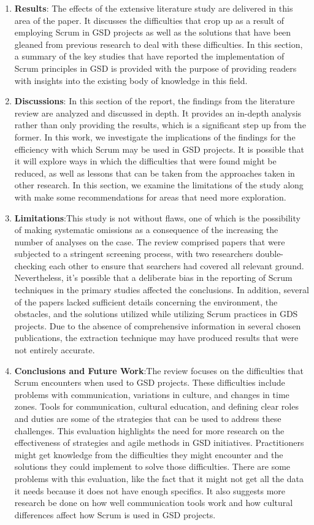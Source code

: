 \documentclass[conference]{IEEEtran}
\begin{document}
\begin{enumerate}
\item \textbf{Results}: The effects of the extensive literature study are delivered in this area of the paper. It discusses the difficulties that crop up as a result of employing Scrum in GSD projects as well as the solutions that have been gleaned from previous research to deal with these difficulties. In this section, a summary of the key studies that have reported the implementation of Scrum principles in GSD is provided with the purpose of providing readers with insights into the existing body of knowledge in this field.

\item \textbf{Discussions}: In this section of the report, the findings from the literature review are analyzed and discussed in depth. It provides an in-depth analysis rather than only providing the results, which is a significant step up from the former. In this work, we investigate the implications of the findings for the efficiency with which Scrum may be used in GSD projects. It is possible that it will explore ways in which the difficulties that were found might be reduced, as well as lessons that can be taken from the approaches taken in other research. In this section, we examine the limitations of the study along with make some recommendations for areas that need more exploration.
\item \textbf{Limitations}:This study is not without flaws, one of which is the possibility of making systematic omissions as a consequence of the increasing the number of analyses on the case. The review comprised papers that were subjected to a stringent screening process, with two researchers double-checking each other to ensure that searchers had covered all relevant ground. Nevertheless, it's possible that a deliberate bias in the reporting of Scrum techniques in the primary studies affected the conclusions. In addition, several of the papers lacked sufficient details concerning the environment, the obstacles, and the solutions utilized while utilizing Scrum practices in GDS projects. Due to the absence of comprehensive information in several chosen publications, the extraction technique may have produced results that were not entirely accurate.
\item \textbf{Conclusions and Future Work}:The review focuses on the difficulties that Scrum encounters when used to GSD projects. These difficulties include problems with communication, variations in culture, and changes in time zones. Tools for communication, cultural education, and defining clear roles and duties are some of the strategies that can be used to address these challenges. This evaluation highlights the need for more research on the effectiveness of strategies and agile methods in GSD initiatives. Practitioners might get knowledge from the difficulties they might encounter and the solutions they could implement to solve those difficulties. There are some problems with this evaluation, like the fact that it might not get all the data it needs because it does not have enough specifics. It also suggests more research be done on how well communication tools work and how cultural differences affect how Scrum is used in GSD projects.


\end{enumerate}
\end{document}
